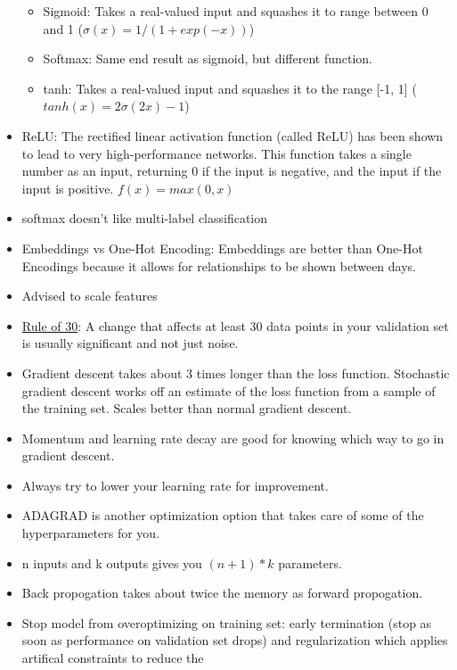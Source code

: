 \documentclass[]{book}
\theoremstyle{definition}
\theoremstyle{definition}
\theoremstyle{definition}
\theoremstyle{remark}
\begin{document}
\begin{itemize}
  \begin{itemize}
  \item
    Sigmoid: Takes a real-valued input and squashes it to range between
    0 and 1 (\(σ(x) = 1 / (1 + exp(−x))\))
  \item
    Softmax: Same end result as sigmoid, but different function.
  \item
    tanh: Takes a real-valued input and squashes it to the range {[}-1,
    1{]} (\(tanh(x) = 2σ(2x) − 1\))
  \end{itemize}
\item
  ReLU: The rectified linear activation function (called ReLU) has been
  shown to lead to very high-performance networks. This function takes a
  single number as an input, returning 0 if the input is negative, and
  the input if the input is positive. \(f(x) = max(0, x)\)
\item
  softmax doesn't like multi-label classification
\item
  Embeddings vs One-Hot Encoding: Embeddings are better than One-Hot
  Encodings because it allows for relationships to be shown between
  days.
\item
  Advised to scale features
\item
  \href{https://www.youtube.com/watch?v=nqEYVzJLR_c\&feature=youtu.be\&t=31}{Rule
  of 30}: A change that affects at least 30 data points in your
  validation set is usually significant and not just noise.
\item
  Gradient descent takes about 3 times longer than the loss function.
  Stochastic gradient descent works off an estimate of the loss function
  from a sample of the training set. Scales better than normal gradient
  descent.
\item
  Momentum and learning rate decay are good for knowing which way to go
  in gradient descent.
\item
  Always try to lower your learning rate for improvement.
\item
  ADAGRAD is another optimization option that takes care of some of the
  hyperparameters for you.
\item
  n inputs and k outputs gives you \((n+1)*k\) parameters.
\item
  Back propogation takes about twice the memory as forward propogation.
\item
  Stop model from overoptimizing on training set: early termination
  (stop as soon as performance on validation set drops) and
  regularization which applies artifical constraints to reduce the

\end{itemize}
\end{document}
